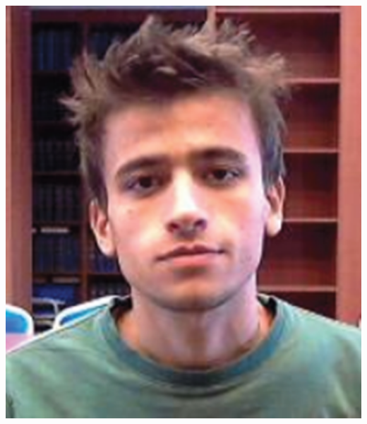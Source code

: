 \documentclass[paper=a4,fontsize=11pt]{temp} %
\begin{document}
\newcommand\textbox[1]{%
  \parbox{.333\textwidth}{#1}%
}


\begin{minipage}{.2\linewidth}
   \includegraphics[width=1\textwidth]{photo}
\end{minipage}      
\end{document}
